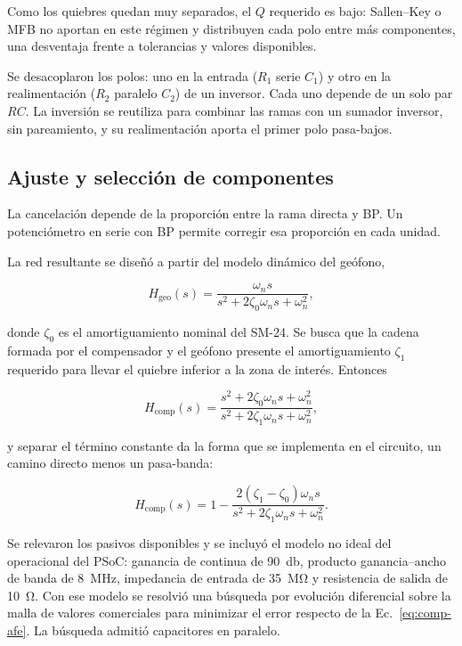 Como los quiebres quedan muy separados, el $Q$ requerido es bajo: Sallen--Key o MFB no
aportan en este régimen y distribuyen cada polo entre más componentes, una desventaja
frente a tolerancias y valores disponibles.

Se desacoplaron los polos: uno en la entrada ($R_1$ serie $C_1$) y otro en la
realimentación ($R_2$ paralelo $C_2$) de un inversor. Cada uno depende de un solo par
$RC$. La inversión se reutiliza para combinar las ramas con un sumador inversor, sin
pareamiento, y su realimentación aporta el primer polo pasa-bajos.

\subsection{Ajuste y selección de componentes}

La cancelación depende de la proporción entre la rama directa y BP. Un potenciómetro en
serie con BP permite corregir esa proporción en cada unidad.

La red resultante se diseñó a partir del modelo dinámico del geófono,

\begin{equation}
H_{\mathrm{geo}}(s)=\frac{\omega_n s}
{s^2+2\zeta_0\omega_n s+\omega_n^2},
\end{equation}

donde $\zeta_0$ es el amortiguamiento nominal del SM-24. Se busca que la cadena formada
por el compensador y el geófono presente el amortiguamiento $\zeta_1$ requerido para
llevar el quiebre inferior a la zona de interés. Entonces

\begin{equation}
H_{\mathrm{comp}}(s)=
\frac{s^2+2\zeta_0\omega_n s+\omega_n^2}{s^2+2\zeta_1\omega_n s+\omega_n^2},
\end{equation}

y separar el término constante da la forma que se implementa en el circuito, un camino
directo menos un pasa-banda:

\begin{equation}
H_{\mathrm{comp}}(s)=1-\frac{2(\zeta_1-\zeta_0)\omega_n s}
{s^2+2\zeta_1\omega_n s+\omega_n^2}.
\label{eq:comp-afe}
\end{equation}

Se relevaron los pasivos disponibles y se incluyó el modelo no ideal del operacional del
PSoC: ganancia de continua de
\SI{90}{\decibel}, producto ganancia--ancho de banda de \SI{8}{\mega\hertz}, impedancia
de entrada de \SI{35}{\mega\ohm} y resistencia de salida de \SI{10}{\ohm}. Con ese modelo
se resolvió una búsqueda por evolución diferencial sobre la malla de valores comerciales
para minimizar el error respecto de la Ec.~\eqref{eq:comp-afe}. La búsqueda admitió
capacitores en paralelo.

